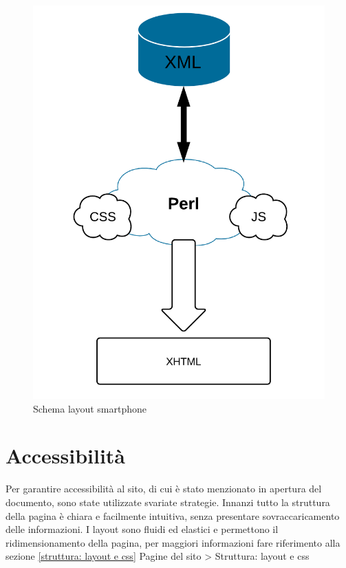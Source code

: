 \begin{center}
\begin{figure}[H]
\centering
\includegraphics[scale=0.55]{images/struttura.png}
\caption{Schema layout smartphone}
\end{figure}
\end{center}

\section{Accessibilità}

Per garantire accessibilità al sito, di cui è stato menzionato in apertura del documento, sono state utilizzate svariate strategie.
Innanzi tutto la struttura della pagina è chiara e facilmente intuitiva, senza presentare sovraccaricamento delle informazioni.
I layout sono fluidi ed elastici e permettono il ridimensionamento della pagina, per maggiori informazioni fare riferimento alla sezione \ref{struttura: layout e css} Pagine del sito > Struttura: layout e css

